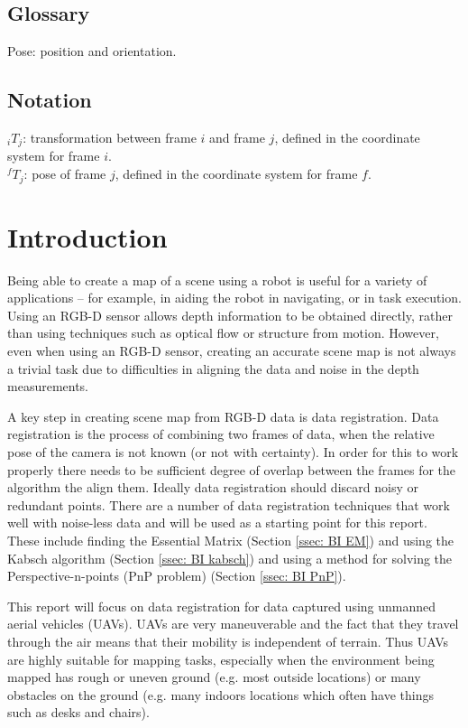 \documentclass[12pt,a4paper]{article}
\begin{document}
\subsection{Glossary}
\label{ssec: gloss}
Pose: position and orientation.

\subsection{Notation}
\label{ssec: not}
${}_iT_j$: transformation between frame $i$ and frame $j$, defined in the coordinate system for frame $i$. \\
${}^fT_j$: pose of frame $j$, defined in the coordinate system for frame $f$.


\pagebreak
\section{Introduction}
  \label{sec: intro}
  Being able to create a map of a scene using a robot is useful for a variety of applications -- for example, in aiding the robot in navigating, or in task execution. Using an RGB-D sensor allows depth information to be obtained directly, rather than using techniques such as optical flow or structure from motion. However, even when using an RGB-D sensor, creating an accurate scene map is not always a trivial task due to difficulties in aligning the data and noise in the depth measurements.
   
  A key step in creating scene map from RGB-D data is data registration. Data registration is the process of combining two frames of data, when the relative pose of the camera is not known (or not with certainty). In order for this to work properly there needs to be sufficient degree of overlap between the frames for the algorithm the align them. Ideally data registration should discard noisy or redundant points. There are a number of data registration techniques that work well with noise-less data and will be used as a starting point for this report. These include finding the Essential Matrix (Section \ref{ssec: BI EM}) and using the Kabsch algorithm (Section \ref{ssec: BI kabsch}) and using a method for solving the Perspective-n-points (PnP problem) (Section \ref{ssec: BI PnP}).
   
  This report will focus on data registration for data captured using unmanned aerial vehicles (UAVs). UAVs are very maneuverable and the fact that they travel through the air means that their mobility is independent of terrain. Thus UAVs are highly suitable for mapping tasks, especially when the environment being mapped has rough or uneven ground (e.g. most outside locations) or many obstacles on the ground (e.g. many indoors locations which often have things such as desks and chairs).
   
\end{document}
